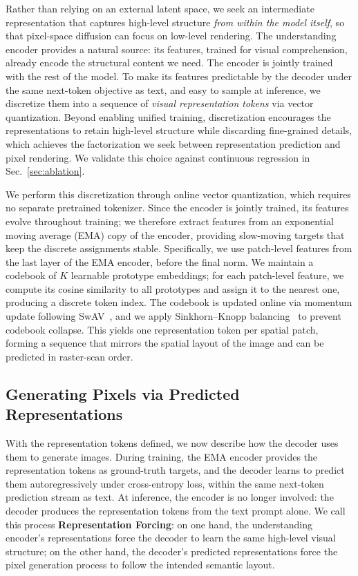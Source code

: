 \documentclass{llmxive}
\begin{document}
Rather than relying on an external latent space, we seek an intermediate representation that captures high-level structure \emph{from within the model itself}, so that pixel-space diffusion can focus on low-level rendering. The understanding encoder provides a natural source: its features, trained for visual comprehension, already encode the structural content we need. The encoder is jointly trained with the rest of the model. To make its features predictable by the decoder under the same next-token objective as text, and easy to sample at inference, we discretize them into a sequence of \emph{visual representation tokens} via vector quantization. Beyond enabling unified training, discretization encourages the representations to retain high-level structure while discarding fine-grained details, which achieves the factorization we seek between representation prediction and pixel rendering. We validate this choice against continuous regression in Sec.~\ref{sec:ablation}.

We perform this discretization through online vector quantization, which requires no separate pretrained tokenizer. Since the encoder is jointly trained, its features evolve throughout training; we therefore extract features from an exponential moving average (EMA) copy of the encoder, providing slow-moving targets that keep the discrete assignments stable. Specifically, we use patch-level features from the last layer of the EMA encoder, before the final norm. We maintain a codebook of $K$ learnable prototype embeddings; for each patch-level feature, we compute its cosine similarity to all prototypes and assign it to the nearest one, producing a discrete token index. The codebook is updated online via momentum update following SwAV~\cite{swav}, and we apply Sinkhorn--Knopp balancing~\cite{knight2008sinkhorn} to prevent codebook collapse. This yields one representation token per spatial patch, forming a sequence that mirrors the spatial layout of the image and can be predicted in raster-scan order.




\subsection{Generating Pixels via Predicted Representations}
\label{sec:3.2}

With the representation tokens defined, we now describe how the decoder uses them to generate images. During training, the EMA encoder provides the representation tokens as ground-truth targets, and the decoder learns to predict them autoregressively under cross-entropy loss, within the same next-token prediction stream as text. At inference, the encoder is no longer involved: the decoder produces the representation tokens from the text prompt alone. We call this process \textbf{Representation Forcing}: on one hand, the understanding encoder's representations force the decoder to learn the same high-level visual structure; on the other hand, the decoder's predicted representations force the pixel generation process to follow the intended semantic layout.
\end{document}
